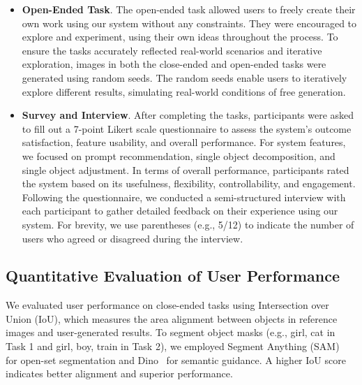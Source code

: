 \begin{itemize}
    \item \textbf{Open-Ended Task}.
    The open-ended task allowed users to freely create their own work using our system without any constraints. 
    They were encouraged to explore and experiment, using their own ideas throughout the process.
    To ensure the tasks accurately reflected real-world scenarios and iterative exploration, images in both the close-ended and open-ended tasks were generated using random seeds. 
    The random seeds enable users to iteratively explore different results, simulating real-world conditions of free generation.
    
    \item \textbf{Survey and Interview}.
    After completing the tasks, participants were asked to fill out a 7-point Likert scale questionnaire to assess the system's outcome satisfaction, feature usability, and overall performance. 
    For system features, we focused on prompt recommendation, single object decomposition, and single object adjustment. 
    In terms of overall performance, participants rated the system based on its usefulness, flexibility, controllability, and engagement. 
    Following the questionnaire, we conducted a semi-structured interview with each participant to gather detailed feedback on their experience using our system. 
    For brevity, we use parentheses (e.g., 5/12) to indicate the number of users who agreed or disagreed during the interview.

\end{itemize}



\subsection{Quantitative Evaluation of User Performance}



We evaluated user performance on close-ended tasks using Intersection over Union (IoU), which measures the area alignment between objects in reference images and user-generated results. 
To segment object masks (e.g., girl, cat in Task 1 and girl, boy, train in Task 2), we employed Segment Anything (SAM)~\cite{kirillov2023segment} for open-set segmentation and Dino~\cite{liu2023grounding} for semantic guidance. 
A higher IoU score indicates better alignment and superior performance.


